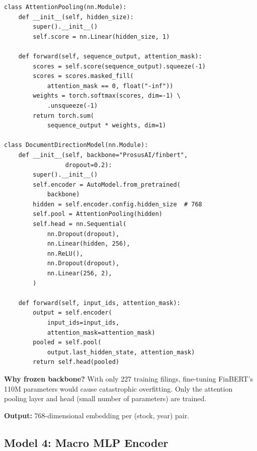 \documentclass[12pt,a4paper]{article}
\begin{document}
\begin{lstlisting}[caption={FinBERT with attention pooling (src/models/document\_model.py)}]
class AttentionPooling(nn.Module):
    def __init__(self, hidden_size):
        super().__init__()
        self.score = nn.Linear(hidden_size, 1)

    def forward(self, sequence_output, attention_mask):
        scores = self.score(sequence_output).squeeze(-1)
        scores = scores.masked_fill(
            attention_mask == 0, float("-inf"))
        weights = torch.softmax(scores, dim=-1) \
            .unsqueeze(-1)
        return torch.sum(
            sequence_output * weights, dim=1)

class DocumentDirectionModel(nn.Module):
    def __init__(self, backbone="ProsusAI/finbert",
                 dropout=0.2):
        super().__init__()
        self.encoder = AutoModel.from_pretrained(
            backbone)
        hidden = self.encoder.config.hidden_size  # 768
        self.pool = AttentionPooling(hidden)
        self.head = nn.Sequential(
            nn.Dropout(dropout),
            nn.Linear(hidden, 256),
            nn.ReLU(),
            nn.Dropout(dropout),
            nn.Linear(256, 2),
        )

    def forward(self, input_ids, attention_mask):
        output = self.encoder(
            input_ids=input_ids,
            attention_mask=attention_mask)
        pooled = self.pool(
            output.last_hidden_state, attention_mask)
        return self.head(pooled)
\end{lstlisting}

\textbf{Why frozen backbone?} With only 227 training filings, fine-tuning FinBERT's 110M parameters would cause catastrophic overfitting. Only the attention pooling layer and head (small number of parameters) are trained.

\textbf{Output:} 768-dimensional embedding per (stock, year) pair.

\subsection{Model 4: Macro MLP Encoder}
\end{document}

